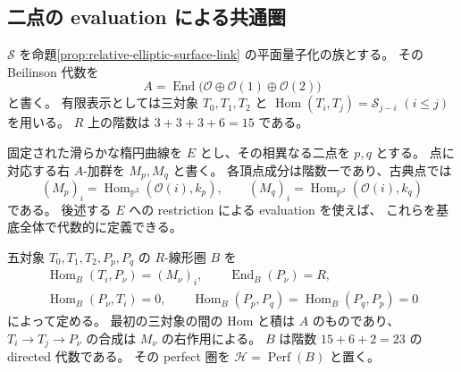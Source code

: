 \subsection{二点の evaluation による共通圏}

$\mathcal S$ を命題\ref{prop:relative-elliptic-surface-link} の平面量子化の族とする。
その Beilinson 代数を
\[
 A=\operatorname{End}\bigl(\mathcal O\oplus\mathcal O(1)\oplus\mathcal O(2)\bigr)
\]
と書く。
有限表示としては三対象 $T_0,T_1,T_2$ と
$\operatorname{Hom}(T_i,T_j)=\mathcal S_{j-i}$ $(i\le j)$ を用いる。
$R$ 上の階数は $3+3+3+6=15$ である。

固定された滑らかな楕円曲線を $E$ とし、その相異なる二点を $p,q$ とする。
点に対応する右 $A$-加群を $M_p,M_q$ と書く。
各頂点成分は階数一であり、古典点では
\[
 (M_p)_i=\operatorname{Hom}_{\mathbb P^2}(\mathcal O(i),k_p),
 \qquad
 (M_q)_i=\operatorname{Hom}_{\mathbb P^2}(\mathcal O(i),k_q)
\]
である。
後述する $E$ への restriction による evaluation を使えば、
これらを基底全体で代数的に定義できる。

五対象 $T_0,T_1,T_2,P_p,P_q$ の $R$-線形圏 $B$ を
\[
 \begin{gathered}
 \operatorname{Hom}_B(T_i,P_\nu)=(M_\nu)_i,
 \qquad \operatorname{End}_B(P_\nu)=R,\\
 \operatorname{Hom}_B(P_\nu,T_i)=0,
 \qquad \operatorname{Hom}_B(P_p,P_q)=\operatorname{Hom}_B(P_q,P_p)=0
 \end{gathered}
\]
によって定める。
最初の三対象の間の Hom と積は $A$ のものであり、
$T_i\to T_j\to P_\nu$ の合成は $M_\nu$ の右作用による。
$B$ は階数 $15+6+2=23$ の directed 代数である。
その perfect 圏を $\mathcal H=\operatorname{Perf}(B)$ と置く。

